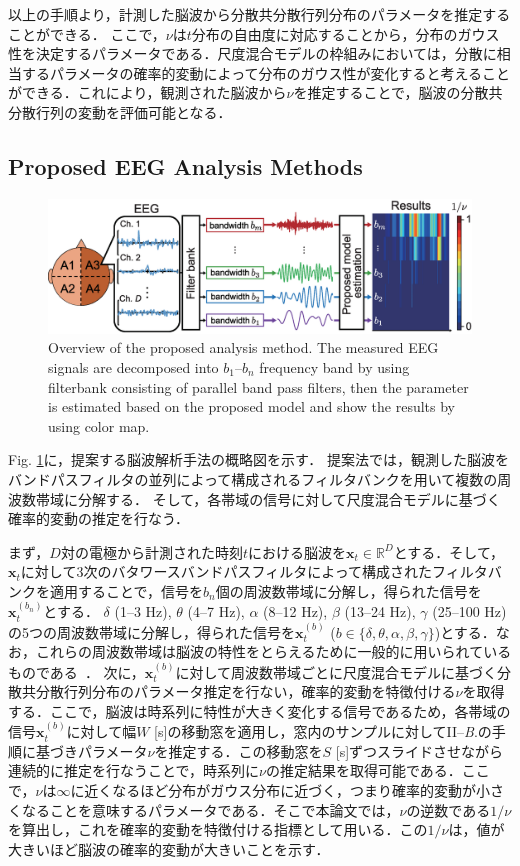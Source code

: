 \documentclass[journal]{IEEEtran}
\begin{document}
以上の手順より，計測した脳波から分散共分散行列分布のパラメータを推定することができる．
ここで，$\nu$は$t$分布の自由度に対応することから，分布のガウス性を決定するパラメータである．尺度混合モデルの枠組みにおいては，分散に相当するパラメータの確率的変動によって分布のガウス性が変化すると考えることができる．これにより，観測された脳波から$\nu$を推定することで，脳波の分散共分散行列の変動を評価可能となる．

\subsection{Proposed EEG Analysis Methods}
\begin{figure}[!ht]
\centering
\includegraphics[width=0.95\hsize]{figure/system_3.eps}
\caption{Overview of the proposed analysis method. The measured EEG signals are decomposed into $b_1$--$b_n$ frequency band by using filterbank consisting of parallel band pass filters, then the parameter is estimated based on the proposed model and show the results by using color map.}
\label{fig:system}
\end{figure}
Fig. \ref{fig:system}に，提案する脳波解析手法の概略図を示す．
提案法では，観測した脳波をバンドパスフィルタの並列によって構成されるフィルタバンクを用いて複数の周波数帯域に分解する．
そして，各帯域の信号に対して尺度混合モデルに基づく確率的変動の推定を行なう．

まず，$D$対の電極から計測された時刻$t$における脳波を$\mathbf{x}_t \in \mathbb{R}^D$とする．そして，$\mathbf{x}_t$に対して3次のバタワースバンドパスフィルタによって構成されたフィルタバンクを適用することで，信号を$b_n$個の周波数帯域に分解し，得られた信号を$\mathbf{x}^{(b_n)}_t$とする．
$\delta$ (1--3 Hz), $\theta$ (4--7 Hz), $\alpha$ (8--12 Hz), $\beta$ (13--24 Hz), $\gamma$ (25--100 Hz) の5つの周波数帯域に分解し，得られた信号を$\mathbf{x}^{(b)}_t$ ($b \in\{\delta, \theta, \alpha,\beta, \gamma\}$)とする．なお，これらの周波数帯域は脳波の特性をとらえるために一般的に用いられているものである~\cite{ep1994}．
次に，$\mathbf{x}^{(b)}_t$に対して周波数帯域ごとに尺度混合モデルに基づく分散共分散行列分布のパラメータ推定を行ない，確率的変動を特徴付ける$\nu$を取得する．ここで，脳波は時系列に特性が大きく変化する信号であるため，各帯域の信号$\mathbf{x}^{(b)}_t$に対して幅$W$ [s]の移動窓を適用し，窓内のサンプルに対してII--\textit{B}.の手順に基づきパラメータ$\nu$を推定する．この移動窓を$S$ [s]ずつスライドさせながら連続的に推定を行なうことで，時系列に$\nu$の推定結果を取得可能である．ここで，$\nu$は$\infty$に近くなるほど分布がガウス分布に近づく，つまり確率的変動が小さくなることを意味するパラメータである．そこで本論文では，$\nu$の逆数である$1/\nu$を算出し，これを確率的変動を特徴付ける指標として用いる．この$1/\nu$は，値が大きいほど脳波の確率的変動が大きいことを示す．
\end{document}
